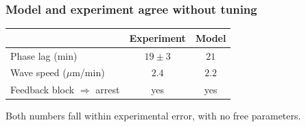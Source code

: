 \documentclass[aspectratio=169, 11pt, t]{beamer}
\begin{document}
\begin{frame}
  \frametitle{Model and experiment agree without tuning}
  \vskip0.1cm
  \begin{center}\small
  \begin{tabular}{@{}lcc@{}}
    \toprule
    & \textbf{Experiment} & \textbf{Model} \\ \midrule
    Phase lag (min)              & $19 \pm 3$ & $21$ \\
    Wave speed ($\mu$m/min)      & $2.4$      & $2.2$ \\
    Feedback block $\Rightarrow$ arrest & yes & yes \\
    \bottomrule
  \end{tabular}
  \end{center}
  \vskip0.2cm
  Both numbers fall within experimental error, with no free parameters.
\end{frame}


\end{document}
